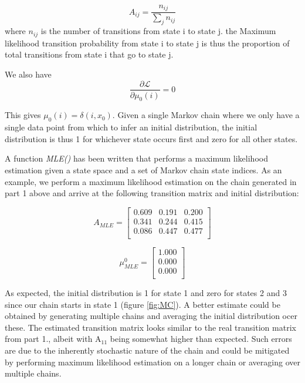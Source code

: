 \documentclass{article}
\begin{document}
\begin{equation}
A_{ij} = \dfrac{n_{ij} }{ \sum_j{n_{ij}} }
\end{equation}
where $n_{ij}$ is the number of transitions from state i to state j. the Maximum likelihood transition probability  from state i to state j is thus the proportion of total transitions from state i that go to state j.

We also have 
\begin{equation}
\dfrac{\partial \mathcal{L}}{\partial \mu_0(i)} = 0
\end{equation}

This gives $\mu_0(i) = \delta(i, x_0)$. Given a single Markov chain where we only have a single data point from which to infer an initial distribution, the initial distribution is thus 1 for whichever state occurs first and zero for all other states.

A function \textit{MLE()} has been written that performs a maximum likelihood estimation given a state space and a set of Markov chain state indices. 
As an example, we perform a maximum likelihood estimation on the chain generated in part 1 above and arrive at the following transition matrix and initial distribution:


\[
A_{MLE} = 
\begin{bmatrix}
   0.609 &  0.191 &  0.200 \\
   0.341 &  0.244 &  0.415 \\
   0.086 & 0.447 & 0.477 \\
\end{bmatrix}
\]

\[
\mu^0_{MLE} = 
\begin{bmatrix}
   1.000 \\
   0.000  \\
   0.000  \\
\end{bmatrix}
\]

As expected, the initial distribution is 1 for state 1 and zero for states 2 and 3 since our chain starts in state 1 (figure \ref{fig:MC}). A better estimate could be obtained by generating multiple chains and averaging the initial distribution ocer these.
The estimated transition matrix looks similar to the real transition matrix from part 1., albeit with $\text{A}_{11}$ being somewhat higher than expected. Such errors are due to the inherently stochastic nature of the chain and could be mitigated by performing maximum likelihood estimation on a longer chain or averaging over multiple chains.
\end{document}
